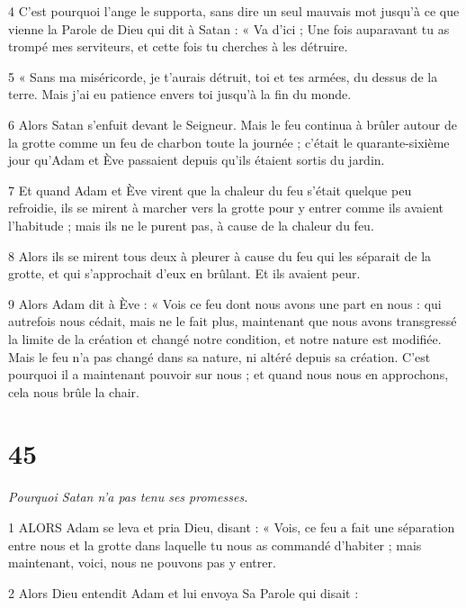 \par 4 C'est pourquoi l'ange le supporta, sans dire un seul mauvais mot jusqu'à ce que vienne la Parole de Dieu qui dit à Satan : « Va d'ici ; Une fois auparavant tu as trompé mes serviteurs, et cette fois tu cherches à les détruire.

\par 5 « Sans ma miséricorde, je t'aurais détruit, toi et tes armées, du dessus de la terre. Mais j’ai eu patience envers toi jusqu’à la fin du monde.

\par 6 Alors Satan s'enfuit devant le Seigneur. Mais le feu continua à brûler autour de la grotte comme un feu de charbon toute la journée ; c'était le quarante-sixième jour qu'Adam et Ève passaient depuis qu'ils étaient sortis du jardin.

\par 7 Et quand Adam et Ève virent que la chaleur du feu s'était quelque peu refroidie, ils se mirent à marcher vers la grotte pour y entrer comme ils avaient l'habitude ; mais ils ne le purent pas, à cause de la chaleur du feu.

\par 8 Alors ils se mirent tous deux à pleurer à cause du feu qui les séparait de la grotte, et qui s'approchait d'eux en brûlant. Et ils avaient peur.

\par 9 Alors Adam dit à Ève : « Vois ce feu dont nous avons une part en nous : qui autrefois nous cédait, mais ne le fait plus, maintenant que nous avons transgressé la limite de la création et changé notre condition, et notre nature est modifiée. Mais le feu n'a pas changé dans sa nature, ni altéré depuis sa création. C'est pourquoi il a maintenant pouvoir sur nous ; et quand nous nous en approchons, cela nous brûle la chair.

\chapter{45}

\par \textit{Pourquoi Satan n'a pas tenu ses promesses.}

\par 1 ALORS Adam se leva et pria Dieu, disant : « Vois, ce feu a fait une séparation entre nous et la grotte dans laquelle tu nous as commandé d'habiter ; mais maintenant, voici, nous ne pouvons pas y entrer.

\par 2 Alors Dieu entendit Adam et lui envoya Sa Parole qui disait :

